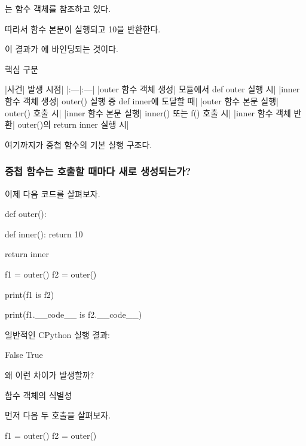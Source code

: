 는  함수 객체를 참조하고 있다.

따라서  함수 본문이 실행되고 10을 반환한다.

이 결과가 에 바인딩되는 것이다.

\begin{dhknote}
\begin{dhksmry}[centered]
핵심 구분
\end{dhksmry}
\end{dhknote}

\begin{dhktable}
|사건|	발생 시점|
|:---|:---|
|outer 함수 객체 생성|	모듈에서 def outer 실행 시|
|inner 함수 객체 생성|	outer() 실행 중 def inner에 도달할 때|
|outer 함수 본문 실행|	outer() 호출 시|
|inner 함수 본문 실행|	inner() 또는 f() 호출 시|
|inner 함수 객체 반환|	outer()의 return inner 실행 시|
\end{dhktable}

여기까지가 중첩 함수의 기본 실행 구조다.

\subsubsection{중첩 함수는 호출할 때마다 새로 생성되는가?}

이제 다음 코드를 살펴보자.

\begin{dhkcode}
def outer():

    def inner():
        return 10

    return inner


f1 = outer()
f2 = outer()

print(f1 is f2)

print(f1.__code__ is f2.__code__)
\end{dhkcode}

일반적인 CPython 실행 결과:

\begin{dhkzsh}
False
True
\end{dhkzsh}

왜 이런 차이가 발생할까?

\begin{dhknote}
\begin{dhksmry}[centered]
함수 객체의 식별성
\end{dhksmry}
\end{dhknote}

먼저 다음 두 호출을 살펴보자.

\begin{dhkcode}
f1 = outer()
f2 = outer()
\end{dhkcode}

